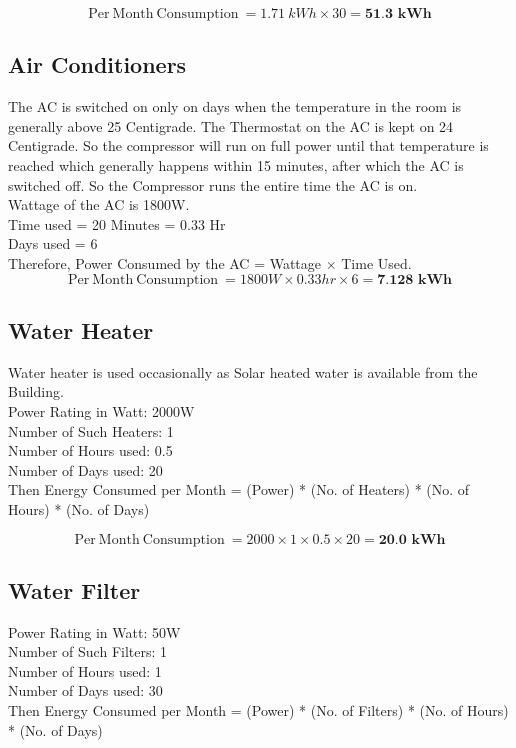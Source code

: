 \documentclass[11pt,a4paper]{article}
\begin{document}
$$
\mathrm{Per\ Month\ Consumption\ } = 1.71\ kWh \times 30 = \textbf{51.3\ kWh}
$$

\subsection{Air Conditioners}
The AC is switched on only on days when the temperature in the room is generally above 25 \degree Centigrade. The Thermostat on the AC is kept on 24 \degree Centigrade. So the compressor will run on full power until that temperature is reached which generally happens within 15 minutes, after which the AC is switched off. So the Compressor runs the entire time the AC is on. \\
\noindent
Wattage of the AC is 1800W. \\
Time used = 20 Minutes = 0.33 Hr\\
Days used = 6\\
Therefore, 
Power Consumed by the AC = Wattage $\times$ Time Used. 
$$
\mathrm{Per\ Month\ Consumption\ } = 1800W \times 0.33hr \times 6 = \textbf{7.128\ kWh}
$$
\subsection{Water Heater}
Water heater is used occasionally as Solar heated water is available from the Building. \\

\noindent
Power Rating in Watt: 2000W\\
Number of Such Heaters: 1\\
Number of Hours used: 0.5\\
Number of Days used: 20\\

Then Energy Consumed per Month = (Power) * (No. of Heaters) * (No. of Hours) * (No. of Days)

$$
\mathrm{Per\ Month\ Consumption\ } = 2000 \times 1 \times 0.5 \times 20 = \textbf{20.0\ kWh}
$$

\subsection{Water Filter}
\noindent
Power Rating in Watt: 50W\\
Number of Such Filters: 1\\
Number of Hours used: 1\\
Number of Days used: 30\\

Then Energy Consumed per Month = (Power) * (No. of Filters) * (No. of Hours) * (No. of Days)
\end{document}
